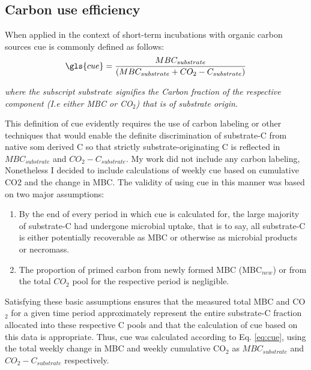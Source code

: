 \documentclass[12pt]{report}
\begin{document}
		\subsection{Carbon use efficiency}
		
		When applied in the context of short-term incubations with organic carbon sources \gls{cue} is commonly defined as follows:\\
		
		\begin{align}
		\gls{cue} = \frac{MBC_{substrate}}{(MBC_{substrate} + CO_2-C_{substrate})}\label{eq:cue}
		\end{align}
		
		\begin{adjustwidth}{50pt}{50pt}
			\begin{footnotesize}
				\textit{where the subscript $ substrate $ signifies the Carbon fraction of the respective component (I.e either MBC or CO$ _2 $) that is of substrate origin.
				}\\
			\end{footnotesize}
		\end{adjustwidth}
		This definition of \gls{cue} evidently requires the use of carbon labeling or other techniques that would enable the definite discrimination of substrate-C from native \gls{som} derived C so that strictly substrate-originating C is reflected in $ MBC_{substrate} $ and $ CO_2-C_{substrate} $.
		My work did not include any carbon labeling, Nonetheless I decided to include calculations of weekly \gls{cue} based on cumulative CO2 and the change in MBC. The validity of using \gls{cue} in this manner was based on two major assumptions:\\
		\begin{enumerate}
			\item By the end of every period in which \gls{cue} is calculated for, the large majority of substrate-C had undergone microbial uptake, that is to say, all substrate-C is either potentially recoverable as MBC or otherwise as microbial products or necromass.
			\item The proportion of primed carbon from newly formed MBC (MBC$ _{new} $) or from the total $ CO_2 $ pool for the respective period is negligible.
		\end{enumerate}
		Satisfying these basic assumptions ensures that the measured total MBC and CO$ _2 $  for a given time period approximately represent the entire substrate-C fraction allocated into these respective C pools and that the calculation of \gls{cue} based on this data is appropriate. Thus, \gls{cue} was calculated according to Eq. \ref{eq:cue}, using the total weekly change in MBC and weekly cumulative CO$ _2 $ as  $MBC_{substrate} $ and $ CO_2-C_{substrate} $ respectively.
		
\end{document}
